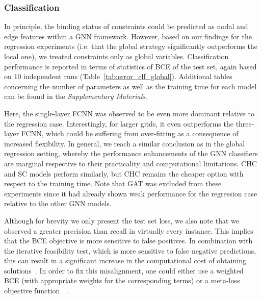 \documentclass[journal]{IEEEtran}
\begin{document}
\subsubsection{Classification}
In principle, the binding status of constraints could be predicted as nodal and edge features within a GNN framework.
However, based on our findings for the regression experiments (i.e. that the global strategy significantly outperforms the local one), we treated constraints only as global variables.
Classification performance is reported in terms of statistics of BCE of the test set, again based on 10 independent runs (Table~\ref{tab:error_clf_global}). Additional tables concerning the number of parameters as well as the training time for each model can be found in the \textit{Supplementary Materials}.

Here, the single-layer FCNN was observed to be even more dominant relative to the regression case.
Interestingly, for larger grids, it even outperforms the three-layer FCNN, which could be suffering from over-fitting as a consequence of increased flexibility. In general, we reach a similar conclusion as in the global regression setting, whereby the performance enhancements of the GNN classifiers are marginal respective to their practicality and computational limitations.
CHC and SC models perform similarly, but CHC remains the cheaper option with respect to the training time. Note that GAT was excluded from these experiments since it had already shown weak performance for the regression case relative to the other GNN models.

Although for brevity we only present the test set loss, we also note that we observed a greater precision than recall in virtually every instance.
This implies that the BCE objective is more sensitive to false positives.
In combination with the iterative feasibility test, which is more sensitive to false negative predictions, this can result in a significant increase in the computational cost of obtaining solutions~\cite{Robson2020}.
In order to fix this misalignment, one could either use a weighted BCE (with appropriate weights for the corresponding terms) or a meta-loss objective function~\cite{Jamei2019}~\cite{Robson2020}.
\end{document}
